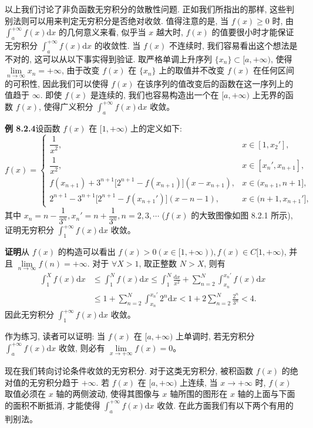 \documentclass[UTF8,12pt,a4paper,fontset=fandol]{ctexart}
\begin{document}
以上我们讨论了非负函数无穷积分的敛散性问题. 正如我们所指出的那样, 这些判别法则可以用来判定无穷积分是否绝对收敛. 值得注意的是, 当 $f(x)\geq0$ 时, 由 $\int_a^{+\infty}f(x)\mathrm dx$ 的几何意义来看, 似乎当 $x$ 越大时, $f(x)$ 的值要很小时才能保证无穷积分 $\int_a^{+\infty}f(x)\mathrm dx$ 的收敛性. 当 $f(x)$ 不连续时, 我们容易看出这个想法是不对的, 这可以从以下事实得到验证. 取严格单调上升序列 $\{x_n\}\subset[a,+\infty)$, 使得 $\lim\limits_{n\to\infty}x_n=+\infty$, 由于改变 $f(x)$ 在 $\{x_n\}$ 上的取值并不改变 $f(x)$ 在任何区间的可积性, 因此我们可以使得 $f(x)$ 在该序列的值改变后的函数在这一序列上的值趋于 $\infty$. 即使 $f(x)$ 是连续的, 我们也容易构造出一个在 $[a,+\infty)$ 上无界的函数 $f(x)$, 使得广义积分 $\int_a^{+\infty}f(x)\mathrm dx$ 收敛。

\noindent\textbf{例 8.2.4}\quad 设函数 $f(x)$ 在 $[1,+\infty)$ 上的定义如下:
\[
  f(x)=
  \begin{cases}
    \dfrac1{x^2}, & x\in[1,x_2'],\\
    \dfrac1{x^2}, & x\in[x_n',x_{n+1}],\\
    f(x_{n+1})+3^{n+1}\bigl[2^{n+1}-f(x_{n+1})\bigr](x-x_{n+1}), & x\in(x_{n+1},n+1],\\
    2^{n+1}-3^{n+1}\bigl[2^{n+1}-f(x_{n+1}')\bigr](x-n-1), & x\in(n+1,x_{n+1}'],
  \end{cases}
\]
其中 $x_n=n-\dfrac1{3^n},x_n'=n+\dfrac1{3^n},n=2,3,\cdots$ ($f(x)$ 的大致图像如图 8.2.1 所示), 证明无穷积分 $\int_1^{+\infty}f(x)\mathrm dx$ 收敛。

\noindent\textbf{证明}\quad 从 $f(x)$ 的构造可以看出 $f(x)>0(x\in[1,+\infty)), f(x)\in C[1,+\infty)$, 并且 $\lim\limits_{n\to\infty}f(n)=+\infty$. 对于 $\forall X>1$, 取正整数 $N>X$, 则有
\[
\begin{aligned}
  \int_1^X f(x)\mathrm dx
  &\leq
  \int_1^N f(x)\mathrm dx
  \leq
  \int_1^N\frac{\mathrm dx}{x^2}
  +
  \sum_{n=2}^N\int_{x_n}^{x_n'}f(x)\mathrm dx\\
  &\leq
  1+\sum_{n=2}^N\int_{x_n}^{x_n'}2^n\mathrm dx
  <
  1+2\sum_{n=2}^N\frac{2^n}{3^n}<4.
\end{aligned}
\]
因此无穷积分 $\int_1^{+\infty}f(x)\mathrm dx$ 收敛。

作为练习, 读者可以证明: 当 $f(x)$ 在 $[a,+\infty)$ 上单调时, 若无穷积分 $\int_a^{+\infty}f(x)\mathrm dx$ 收敛, 则必有 $\lim\limits_{x\to+\infty}f(x)=0$。

现在我们转向讨论条件收敛的无穷积分. 对于这类无穷积分, 被积函数 $f(x)$ 的绝对值的无穷积分趋于 $+\infty$. 若 $f(x)$ 在 $[a,+\infty)$ 上连续, 当 $x\to+\infty$ 时, $f(x)$ 取值必须在 $x$ 轴的两侧波动, 使得其图像与 $x$ 轴所围的图形在 $x$ 轴的上面与下面的面积不断抵消, 才能使得 $\int_a^{+\infty}f(x)\mathrm dx$ 收敛. 在此方面我们有以下两个有用的判别法。
\end{document}
